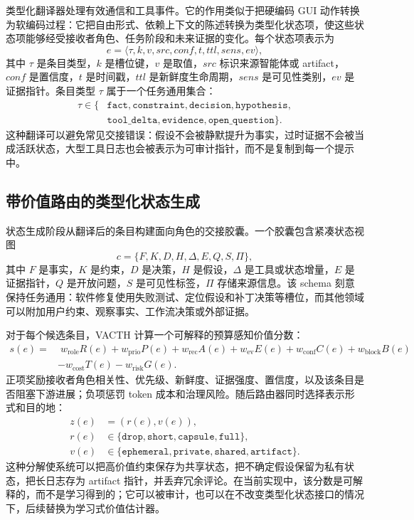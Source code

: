 \documentclass{article} %
\begin{document}
类型化翻译器处理有效通信和工具事件。它的作用类似于把硬编码 GUI 动作转换为软编码过程：它把自由形式、依赖上下文的陈述转换为类型化状态项，使这些状态项能够经受接收者角色、任务阶段和未来证据的变化。每个状态项表示为
\begin{equation}
e=\langle \tau, k, v, src, conf, t, ttl, sens, ev\rangle,
\end{equation}
其中 $\tau$ 是条目类型，$k$ 是槽位键，$v$ 是取值，$src$ 标识来源智能体或 artifact，$conf$ 是置信度，$t$ 是时间戳，$ttl$ 是新鲜度生命周期，$sens$ 是可见性类别，$ev$ 是证据指针。条目类型 $\tau$ 属于一个任务通用集合：
\begin{equation}
\begin{aligned}
\tau \in \{&\mathtt{fact},\mathtt{constraint},\mathtt{decision},\mathtt{hypothesis},\\
&\mathtt{tool\_delta},\mathtt{evidence},\mathtt{open\_question}\}.
\end{aligned}
\end{equation}
这种翻译可以避免常见交接错误：假设不会被静默提升为事实，过时证据不会被当成活跃状态，大型工具日志也会被表示为可审计指针，而不是复制到每一个提示中。

\subsection{带价值路由的类型化状态生成}

状态生成阶段从翻译后的条目构建面向角色的交接胶囊。一个胶囊包含紧凑状态视图
\begin{equation}
c = \{F,K,D,H,\Delta,E,Q,S,\Pi\},
\end{equation}
其中 $F$ 是事实，$K$ 是约束，$D$ 是决策，$H$ 是假设，$\Delta$ 是工具或状态增量，$E$ 是证据指针，$Q$ 是开放问题，$S$ 是可见性标签，$\Pi$ 存储来源信息。该 schema 刻意保持任务通用：软件修复使用失败测试、定位假设和补丁决策等槽位，而其他领域可以附加用户约束、观察事实、工作流决策或外部证据。

对于每个候选条目，VACTH 计算一个可解释的预算感知价值分数：
\begin{align}
s(e)=&\;w_{\mathrm{role}}R(e)+w_{\mathrm{prio}}P(e)+w_{\mathrm{rec}}A(e)+w_{\mathrm{ev}}E(e)
+w_{\mathrm{conf}}C(e)+w_{\mathrm{block}}B(e) \nonumber\\
&-w_{\mathrm{cost}}T(e)-w_{\mathrm{risk}}G(e).
\end{align}
正项奖励接收者角色相关性、优先级、新鲜度、证据强度、置信度，以及该条目是否阻塞下游进展；负项惩罚 token 成本和治理风险。随后路由器同时选择表示形式和目的地：
\begin{equation}
\begin{split}
z(e) &= (r(e), v(e)), \\
r(e) &\in \{\mathtt{drop}, \mathtt{short}, \mathtt{capsule}, \mathtt{full}\}, \\
v(e) &\in \{\mathtt{ephemeral}, \mathtt{private}, \mathtt{shared}, \mathtt{artifact}\}.
\end{split}
\end{equation}
这种分解使系统可以把高价值约束保存为共享状态，把不确定假设保留为私有状态，把长日志存为 artifact 指针，并丢弃冗余评论。在当前实现中，该分数是可解释的，而不是学习得到的；它可以被审计，也可以在不改变类型化状态接口的情况下，后续替换为学习式价值估计器。
\end{document}
